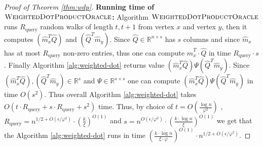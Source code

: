 \documentclass[letterpaper,11pt]{article}
\newcommand{\m}{\widehat{m}}
\newcommand{\R}{\mathbb{R}}
\theoremstyle{plain}
\theoremstyle{definition}
\theoremstyle{remark}
\begin{document}
\begin{proof}[Proof of Theorem \ref{thm:wdp}]
\textbf{Running time of $\textsc{WeightedDotProductOracle}$:} 
Algorithm  $\textsc{WeightedDotProductOracle}$ runs $R_{\text{query}}$ random walks of length $t, t+1$ from vertex $x$ and vertex $y$, then it computes $(\m_x^T  \widehat{Q})$ and $(\widehat{Q}^T \m_y)$. Since $\widehat{Q}\in \R^{n\times s}$ has $s$ columns and since $\m_x$ has at most $R_{\text{query}}$ non-zero entries, thus one can compute $\m_x^T \cdot \widehat{Q}$ in time $R_{\text{query}}\cdot s$. Finally Algorithm \ref{alg:weighted-dot}  returns value $(\m_x^T \widehat{Q}) \Psi (\widehat{Q}^T \m_y)$.  Since $(\m_x^T \widehat{Q}), (\widehat{Q}^T \m_y)\in \R^{s}$ and $\Psi\in \R^{s\times s}$ one can compute  $(\m_x^T \widehat{Q}) \Psi (\widehat{Q}^T \m_y)$ in time $O(s^2)$. Thus overall Algorithm \ref{alg:weighted-dot} takes $O\left(t\cdot R_{\text{query}} + s\cdot R_{\text{query}}  + s^2\right)$ time. Thus, by choice of $t= O\left(\frac{\log n}{\varphi^2}\right)$	, $R_{\text{query}}=n^{1/2+O(\epsilon / \varphi^2)}  \cdot \left(\frac{k}{\xi} \right)^{O(1)}$ and $s= n^{O(\epsilon / \varphi^2)}\cdot (\frac{k\cdot \log n}{\xi})^{O(1)}$  we get that the  Algorithm  \ref{alg:weighted-dot} runs in  time $(\frac{k\cdot \log n}{\xi\cdot \varphi})^{O(1)}\cdot n^{1/2+O(\epsilon/\varphi^2)}$.
\end{proof}
 
\end{document}
